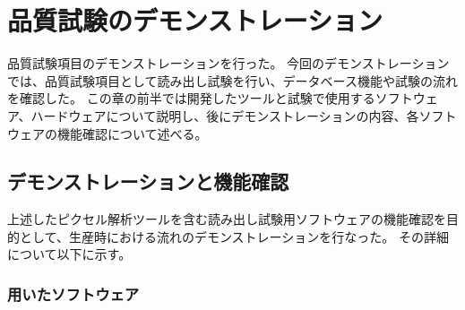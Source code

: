 \chapter{品質試験のデモンストレーション} \label{chap:demo}
品質試験項目のデモンストレーションを行った。
今回のデモンストレーションでは、品質試験項目として読み出し試験を行い、データベース機能や試験の流れを確認した。
この章の前半では開発したツールと試験で使用するソフトウェア、ハードウェアについて説明し、後にデモンストレーションの内容、各ソフトウェアの機能確認について述べる。

\section{デモンストレーションと機能確認}
上述したピクセル解析ツールを含む読み出し試験用ソフトウェアの機能確認を目的として、生産時における流れのデモンストレーションを行なった。
その詳細について以下に示す。

\subsection{用いたソフトウェア}

